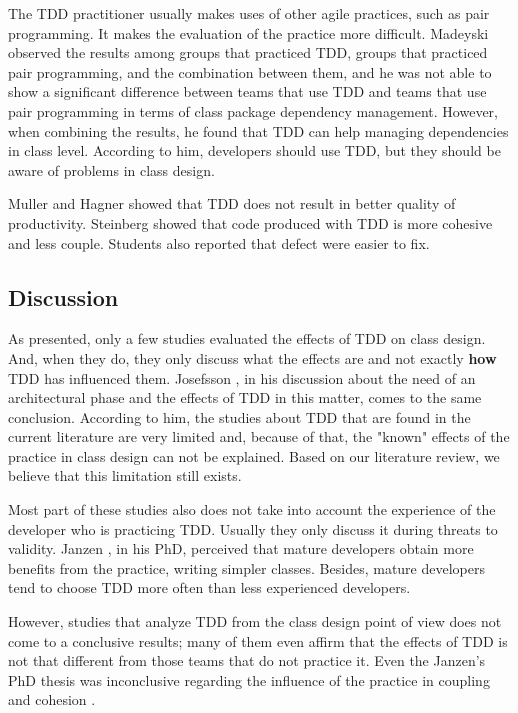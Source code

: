 \documentclass[conference]{IEEEtran}
\begin{document}
The TDD practitioner usually makes uses of other agile practices, such as
pair programming. It makes the evaluation of the practice more difficult.
Madeyski \cite{madeyski-package-dependencies} observed the results
among groups that practiced TDD, groups that practiced pair programming,
and the combination between them, and he was not able to show a significant
difference between teams that use TDD and teams that use pair programming
in terms of class package dependency management. However, when combining
the results, he found that TDD can help managing dependencies in class level.
According to him, developers should use TDD, but they should be aware of 
problems in class design.

Muller and Hagner \cite{muller-e-hagner} showed that TDD does not result in
better quality of productivity. Steinberg \cite{steinberg} showed that
code produced with TDD is more cohesive and less couple. Students also reported
that defect were easier to fix.

\subsection{Discussion}

As presented, only a few studies evaluated the effects of TDD on class design.
And, when they do, they only discuss what the effects are and not exactly
\textbf{how} TDD has influenced them. Josefsson \cite{josefsson}, in his discussion
about the need of an architectural phase and the effects of TDD in this matter,
comes to the same conclusion. According to him, the studies about TDD that are
found in the current literature are very limited and, because of that, the
"known" effects of the practice in class design can not be explained. Based on
our literature review, we believe that this limitation still exists.

Most part of these studies also does not take into account the experience
of the developer who is practicing TDD. Usually they only discuss it
during threats to validity. Janzen \cite{janzen-phd}, in his PhD, perceived
that mature developers obtain more benefits from the practice, writing simpler
classes. Besides, mature developers tend to choose TDD more often than
less experienced developers.

However, studies that analyze TDD from the class design point of view does not
come to a conclusive results; many of them even affirm that the effects of TDD
is not that different from those teams that do not practice it. Even the Janzen's PhD
thesis was inconclusive regarding the influence of the practice in coupling
and cohesion \cite{janzen-phd}. 
\end{document}
